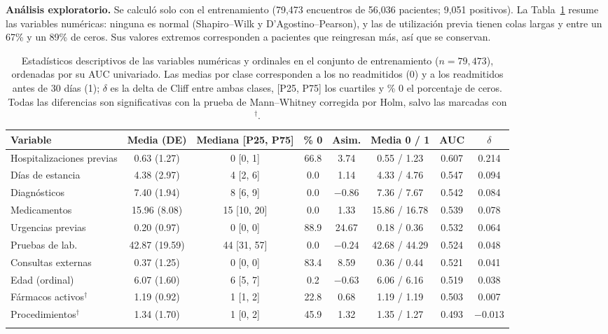\documentclass[pdflatex,sn-mathphys-num]{sn-jnl}
\theoremstyle{plain}
\begin{document}
\textbf{Análisis exploratorio.} Se calculó solo con el entrenamiento (79{,}473 encuentros de 56{,}036 pacientes; 9{,}051 positivos). La Tabla~\ref{tab:eda} resume las variables numéricas: ninguna es normal (Shapiro--Wilk y D'Agostino--Pearson), y las de utilización previa tienen colas largas y entre un 67\% y un 89\% de ceros. Sus valores extremos corresponden a pacientes que reingresan más, así que se conservan.

\begin{table}[!htbp]
\caption{Estadísticos descriptivos de las variables numéricas y ordinales en el conjunto de entrenamiento ($n=79{,}473$), ordenadas por su AUC univariado. Las medias por clase corresponden a los no readmitidos (0) y a los readmitidos antes de 30 días (1); $\delta$ es la delta de Cliff entre ambas clases, [P25, P75] los cuartiles y \% 0 el porcentaje de ceros. Todas las diferencias son significativas con la prueba de Mann--Whitney corregida por Holm, salvo las marcadas con $^\dagger$.}\label{tab:eda}
\small
\setlength{\tabcolsep}{3.5pt}
\begin{tabular}{@{}lccccccc@{}}
\toprule
Variable & Media (DE) & Mediana [P25, P75] & \% 0 & Asim. & Media 0 / 1 & AUC & $\delta$ \\
\midrule
Hospitalizaciones previas & 0.63 (1.27) & 0 [0, 1] & 66.8 & 3.74 & 0.55 / 1.23 & 0.607 & 0.214 \\
Días de estancia & 4.38 (2.97) & 4 [2, 6] & 0.0 & 1.14 & 4.33 / 4.76 & 0.547 & 0.094 \\
Diagnósticos & 7.40 (1.94) & 8 [6, 9] & 0.0 & $-0.86$ & 7.36 / 7.67 & 0.542 & 0.084 \\
Medicamentos & 15.96 (8.08) & 15 [10, 20] & 0.0 & 1.33 & 15.86 / 16.78 & 0.539 & 0.078 \\
Urgencias previas & 0.20 (0.97) & 0 [0, 0] & 88.9 & 24.67 & 0.18 / 0.36 & 0.532 & 0.064 \\
Pruebas de lab. & 42.87 (19.59) & 44 [31, 57] & 0.0 & $-0.24$ & 42.68 / 44.29 & 0.524 & 0.048 \\
Consultas externas & 0.37 (1.25) & 0 [0, 0] & 83.4 & 8.59 & 0.36 / 0.44 & 0.521 & 0.041 \\
Edad (ordinal) & 6.07 (1.60) & 6 [5, 7] & 0.2 & $-0.63$ & 6.06 / 6.16 & 0.519 & 0.038 \\
Fármacos activos$^\dagger$ & 1.19 (0.92) & 1 [1, 2] & 22.8 & 0.68 & 1.19 / 1.19 & 0.503 & 0.007 \\
Procedimientos$^\dagger$ & 1.34 (1.70) & 1 [0, 2] & 45.9 & 1.32 & 1.35 / 1.27 & 0.493 & $-0.013$ \\
\botrule
\end{tabular}
\end{table}
\end{document}

